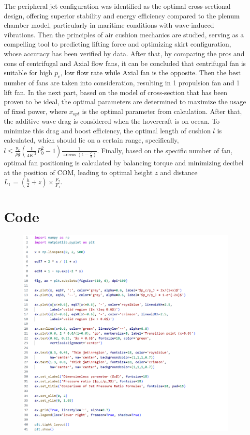 The peripheral jet configuration was identified as the optimal cross-sectional design, offering superior stability and energy efficiency compared to the plenum chamber model, particularly in maritime conditions with wave-induced vibrations. Then the principles of air cushion mechanics are studied, serving as a compelling tool to predicting lifting force and optimizing skirt configuration, whose accuracy has been verified by data. After that, by comparing the pros and cons of centrifugal and Axial flow fans, it can be concluded that centrifugal fan is suitable for high $p_c$, low flow rate while Axial fan is the opposite. Then the best number of fans are taken into consideration, resulting in 1 propulsion fan and 1 lift fan.  In the next part, based on the model of cross-section that has been proven to be ideal, the optimal parameters are determined to maximize the usage of fixed power, where $x_{opt}$ is the optimal parameter from calculation. After that, the additive wave drag is considered when the hovercraft is on ocean. To minimize this drag and boost efficiency, the optimal length of cushion $l$ is calculated, which should lie on a certain range, specifically, $l \leq \frac{p_{c}}{\rho g} \left( \frac{1}{4 K^{\prime 2}} P_{0}^{2} - 1 \right) \frac{1}{\arccos \left( 1 - \frac{\epsilon}{2} \right)}$. Finally, based on the specific number of fan, optimal fan positioning is calculated by balancing torque and minimizing decibel at the position of COM, leading to optimal height $z$ and distance $L_1 = (\frac{h}{2} + z)\times \frac{F_2}{F_1}$.


\newpage
\onecolumngrid
\appendix 

\section{Code}


    \begin{figure}[h]
        \includegraphics[width=\textwidth, height=0.8\textheight]
        {images/plotCompare.png}
    \end{figure}



